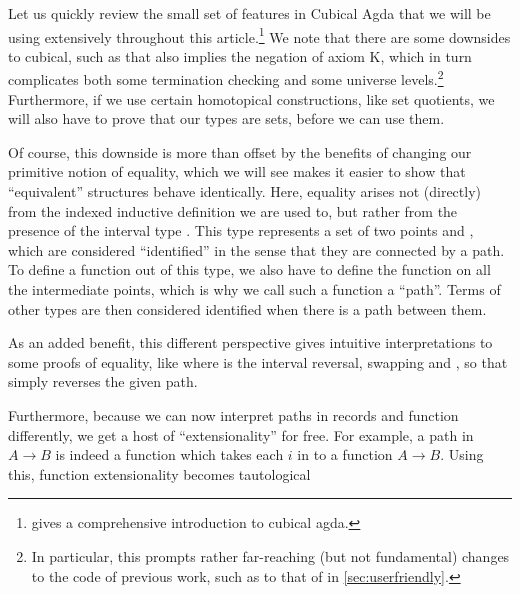 Let us quickly review the small set of features in Cubical Agda that we will be using extensively throughout this article.\footnote{\cite{cuagda} gives a comprehensive introduction to cubical agda.} We note that there are some downsides to cubical, such as that
also implies the negation of axiom K, which in turn complicates both some termination checking and some universe levels.\footnote{In particular, this prompts rather far-reaching (but not fundamental) changes to the code of previous work, such as to that of \cite{progorn} in \autoref{sec:userfriendly}.} Furthermore, if we use certain homotopical constructions, like set quotients, we will also have to prove that our types are sets, before we can use them.

Of course, this downside is more than offset by the benefits of changing our primitive notion of equality, which we will see makes it easier to show that ``equivalent'' structures behave identically. Here, equality arises not (directly) from the indexed inductive definition we are used to, but rather from the presence of the interval type . This type represents a set of two points  and , which are considered ``identified'' in the sense that they are connected by a path. To define a function out of this type, we also have to define the function on all the intermediate points, which is why we call such a function a ``path''. Terms of other types are then considered identified when there is a path between them.

As an added benefit, this different perspective gives intuitive interpretations to some proofs of equality, like
where  is the interval reversal, swapping  and , so that  simply reverses the given path.

Furthermore, because we can now interpret paths in records and function differently, we get a host of ``extensionality'' for free. For example, a path in $A \to B$ is indeed a function which takes each $i$ in  to a function $A \to B$. Using this, function extensionality becomes tautological 


